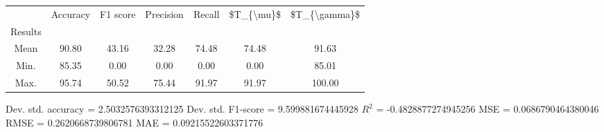 \begin{tabular}{|c|c|c|c|c|c|c|}
\toprule
{} &  Accuracy &  F1 score &  Precision &  Recall &  \$T\_\{\textbackslash mu\}\$ &  \$T\_\{\textbackslash gamma\}\$ \\
Results &           &           &            &         &            &               \\
\hline
Mean    &     90.80 &     43.16 &      32.28 &   74.48 &      74.48 &         91.63 \\
Min.    &     85.35 &      0.00 &       0.00 &    0.00 &       0.00 &         85.01 \\
Max.    &     95.74 &     50.52 &      75.44 &   91.97 &      91.97 &        100.00 \\
\bottomrule
\end{tabular}

 Dev. std. accuracy = 2.5032576393312125
 Dev. std. F1-score = 9.599881674445928
 $R^2$ = -0.4828877274945256
 MSE = 0.0686790464380046
 RMSE = 0.2620668739806781
 MAE = 0.09215522603371776